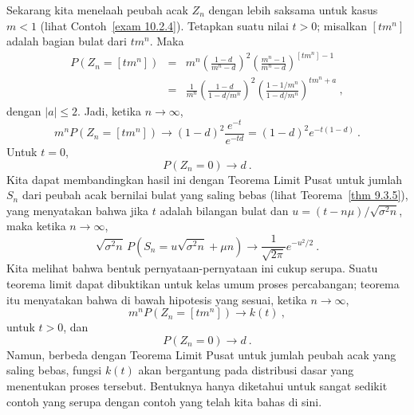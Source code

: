 \begin{example}\label{exam 10.2.4.6}
Sekarang kita menelaah peubah acak $Z_n$ dengan lebih saksama untuk kasus $m < 1$ (lihat
Contoh~\ref{exam 10.2.4}).  Tetapkan suatu nilai $t > 0$; misalkan $[tm^n]$ adalah bagian bulat dari
$tm^n$.  Maka
\begin{eqnarray*}
P(Z_n = [tm^n]) &=& m^n (\frac{1 - d}{m^n - d})^2 (\frac{m^n - 1}{m^n - d})
^{[tm^n] - 1} \\
                &=& \frac1{m^n}(\frac{1 - d}{1 - d/m^n})^2 (\frac{1 - 1/m^n} {1 -
d/m^n})^{tm^n + a}\ ,
\end{eqnarray*}
dengan $|a| \leq 2$.  Jadi, ketika $n \to \infty$,
$$
m^n P(Z_n = [tm^n]) \to (1 - d)^2 \frac{e^{-t}}{e^{-td}} = (1 - d)^2 e^{-t(1 - d)}\ .
$$
Untuk $t = 0$,
$$
P(Z_n = 0) \to d\ .
$$
Kita dapat membandingkan hasil ini dengan Teorema Limit Pusat untuk jumlah~$S_n$ dari
peubah acak bernilai bulat yang saling bebas (lihat Teorema~\ref{thm 9.3.5}), yang
menyatakan bahwa jika $t$ adalah bilangan bulat dan $u = (t - n\mu)/\sqrt{\sigma^2 n}$, maka
ketika $n \to \infty$,
$$
\sqrt{\sigma^2 n}\, P(S_n = u\sqrt{\sigma^2 n} + \mu n) \to \frac1{\sqrt{2\pi}}
e^{-u^2/2}\ .
$$
Kita melihat bahwa bentuk pernyataan-pernyataan ini cukup serupa.  Suatu teorema limit
dapat dibuktikan untuk kelas umum proses percabangan; teorema itu menyatakan
bahwa di bawah hipotesis yang sesuai, ketika $n \to \infty$,
$$
m^n P(Z_n = [tm^n]) \to k(t)\ ,
$$
untuk $t > 0$, dan
$$
P(Z_n = 0) \to d\ .
$$
Namun, berbeda dengan Teorema Limit Pusat untuk jumlah peubah acak yang saling
bebas, fungsi $k(t)$ akan bergantung pada distribusi dasar yang
menentukan proses tersebut.  Bentuknya hanya diketahui untuk sangat sedikit contoh yang serupa
dengan contoh yang telah kita bahas di sini.
\end{example}


